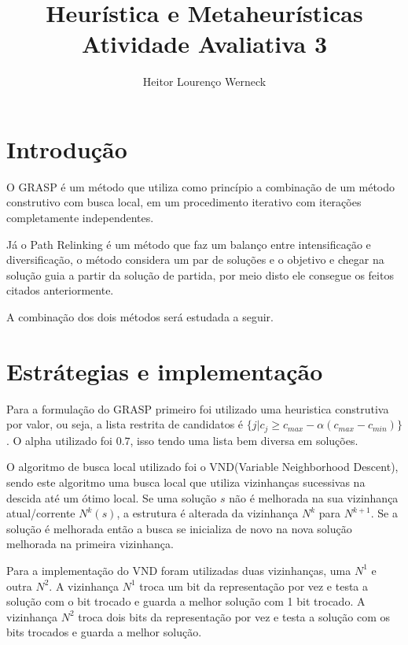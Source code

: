\documentclass[11pt]{article}
\author{Heitor Lourenço Werneck}
\date{}
\title{Heurística e Metaheurísticas\\\medskip
\large Atividade Avaliativa 3}
\begin{document}
\maketitle

\section{Introdução}
\label{sec:org1842bc3}

O GRASP é um método que utiliza como princípio a combinação de um método construtivo com busca local, em um procedimento iterativo com iterações completamente independentes.

Já o Path Relinking é um método que faz um balanço entre intensificação e diversificação, o método considera um par de soluções e o objetivo e chegar na solução guia a partir da solução de partida, por meio disto ele consegue os feitos citados anteriormente.

A combinação dos dois métodos será estudada a seguir.

\section{Estrátegias e implementação}
\label{sec:orgc542255}

Para a formulação do GRASP primeiro foi utilizado uma heuristica construtiva por valor, ou seja, a lista restrita de candidatos é \(\{j | c_j \geq c_{max} - \alpha(c_{max}-c_{min})\}\). O alpha utilizado foi \(0.7\), isso tendo uma lista bem diversa em soluções.

O algoritmo de busca local utilizado foi o VND(Variable Neighborhood Descent), sendo este algoritmo uma busca local que utiliza vizinhanças sucessivas na descida até um ótimo local. Se uma solução \(s\) não é melhorada na sua vizinhança atual/corrente \(N^k(s)\), a estrutura é alterada da vizinhança \(N^k\) para \(N^{k+1}\). Se a solução é melhorada então a busca se inicializa de novo na nova solução melhorada na primeira vizinhança.

Para a implementação do VND foram utilizadas duas vizinhanças, uma \(N^1\) e outra \(N^2\). A vizinhança \(N^1\) troca um bit da representação por vez e testa a solução com o bit trocado e guarda a melhor solução com 1 bit trocado. A vizinhança \(N^2\) troca dois bits da representação por vez e testa a solução com os bits trocados e guarda a melhor solução.
\end{document}
